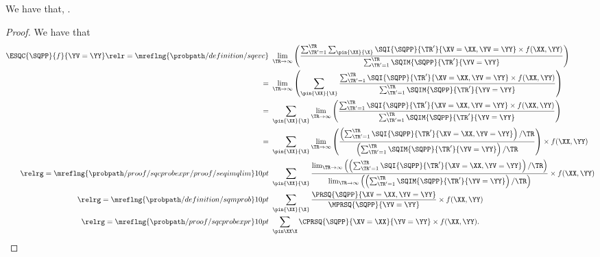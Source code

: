 \begin{proposition}
  We have that, \evsqcexprprop.%
\end{proposition}

\begin{proof}
  We have that
  \begin{align*}
    \ESQC{\SQPP}{f}{\YV = \YY} \relr = {\mreflng{\probpath/definition/sqevc}} \ &\lim_{\TR \rightarrow \infty}
    \left(
    \frac
    {\sum_{\TR' = 1}^{\TR}\sum_{\pin{\XX}{\X}}\SQI{\SQPP}{\TR'}{\XV = \XX, \YV = \YY}\times f(\XX, \YY)}
    {\sum_{\TR' = 1}^{\TR}\SQIM{\SQPP}{\TR'}{\YV = \YY}}
    \right)\\
    = \ &\lim_{\TR \rightarrow \infty}
    \left(
    \sum_{\pin{\XX}{\X}}
    \frac
    {\sum_{\TR' = 1}^{\TR}\SQI{\SQPP}{\TR'}{\XV = \XX, \YV = \YY}\times f(\XX, \YY)}
    {\sum_{\TR' = 1}^{\TR}\SQIM{\SQPP}{\TR'}{\YV = \YY}}
    \right)\\
    = \ &
    \sum_{\pin{\XX}{\X}}
    \lim_{\TR \rightarrow \infty}
    \left(
    \frac
    {\sum_{\TR' = 1}^{\TR}\SQI{\SQPP}{\TR'}{\XV = \XX, \YV = \YY}\times f(\XX, \YY)}
    {\sum_{\TR' = 1}^{\TR}\SQIM{\SQPP}{\TR'}{\YV = \YY}}
    \right)\\
    = \ &
    \sum_{\pin{\XX}{\X}}
    \lim_{\TR \rightarrow \infty}
    \left(
    \frac
    {\left({\sum_{\TR' = 1}^{\TR}\SQI{\SQPP}{\TR'}{\XV = \XX, \YV = \YY}}\right)/{\TR}}
    {\left(\sum_{\TR' = 1}^{\TR}\SQIM{\SQPP}{\TR'}{\YV = \YY}\right)/\TR}
    \right)
    \times f(\XX, \YY)\\
    \relrg = {\mreflng{\probpath/proof/sqcprobexpr/proof/seqimqlim}} 10pt \ & 
    \sum_{\pin{\XX}{\X}}
    \frac
    {
      \lim_{\TR \rightarrow \infty}\left(
    \left({\sum_{\TR' = 1}^{\TR}\SQI{\SQPP}{\TR'}{\XV = \XX, \YV = \YY}}\right)/{\TR}\right)}
    {
      \lim_{\TR \rightarrow \infty}\left(
    \left(\sum_{\TR' = 1}^{\TR}\SQIM{\SQPP}{\TR'}{\YV = \YY}\right)/\TR\right)}
    \times f(\XX, \YY)
    \\
    \relrg = {\mreflng{\probpath/definition/sqmprob}} 10pt \ & 
    \sum_{\pin{\XX}{\X}} \frac { \PRSQ{\SQPP}{\XV = \XX, \YV = \YY} } { \MPRSQ{\SQPP}{\YV = \YY} } 
    \times f(\XX, \YY) \\
    \relrg = {\mreflng{\probpath/proof/sqcprobexpr}} 10pt \ & 
    \sum_{\pin\XX\X}\CPRSQ{\SQPP}{\XV = \XX}{\YV = \YY}\times f(\XX, \YY).
  \end{align*}
\end{proof}
